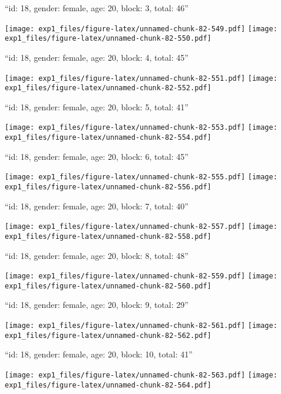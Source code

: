 \documentclass[11pt,,]{article}
\begin{document}
\newpage
[1] 

``id: 18, gender: female, age: 20, block: 3, total: 46''

\texttt{[image: exp1\_files/figure-latex/unnamed-chunk-82-549.pdf]}
\texttt{[image: exp1\_files/figure-latex/unnamed-chunk-82-550.pdf]}

\newpage
[1] 

``id: 18, gender: female, age: 20, block: 4, total: 45''

\texttt{[image: exp1\_files/figure-latex/unnamed-chunk-82-551.pdf]}
\texttt{[image: exp1\_files/figure-latex/unnamed-chunk-82-552.pdf]}

\newpage
[1] 

``id: 18, gender: female, age: 20, block: 5, total: 41''

\texttt{[image: exp1\_files/figure-latex/unnamed-chunk-82-553.pdf]}
\texttt{[image: exp1\_files/figure-latex/unnamed-chunk-82-554.pdf]}

\newpage
[1] 

``id: 18, gender: female, age: 20, block: 6, total: 45''

\texttt{[image: exp1\_files/figure-latex/unnamed-chunk-82-555.pdf]}
\texttt{[image: exp1\_files/figure-latex/unnamed-chunk-82-556.pdf]}

\newpage
[1] 

``id: 18, gender: female, age: 20, block: 7, total: 40''

\texttt{[image: exp1\_files/figure-latex/unnamed-chunk-82-557.pdf]}
\texttt{[image: exp1\_files/figure-latex/unnamed-chunk-82-558.pdf]}

\newpage
[1] 

``id: 18, gender: female, age: 20, block: 8, total: 48''

\texttt{[image: exp1\_files/figure-latex/unnamed-chunk-82-559.pdf]}
\texttt{[image: exp1\_files/figure-latex/unnamed-chunk-82-560.pdf]}

\newpage
[1] 

``id: 18, gender: female, age: 20, block: 9, total: 29''

\texttt{[image: exp1\_files/figure-latex/unnamed-chunk-82-561.pdf]}
\texttt{[image: exp1\_files/figure-latex/unnamed-chunk-82-562.pdf]}

\newpage
[1] 

``id: 18, gender: female, age: 20, block: 10, total: 41''

\texttt{[image: exp1\_files/figure-latex/unnamed-chunk-82-563.pdf]}
\texttt{[image: exp1\_files/figure-latex/unnamed-chunk-82-564.pdf]}
\end{document}
